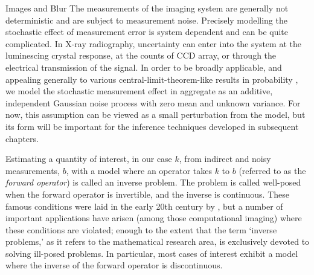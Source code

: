 \begin{chapter}{Images and Blur}
  The measurements of the imaging system are generally not deterministic and are subject to measurement noise.
  Precisely modelling the stochastic effect of measurement error is system dependent and can be quite complicated.
  In X-ray radiography, uncertainty can enter into the system at the luminescing crystal response, at the counts of CCD array, or through the electrical transmission of the signal.
  In order to be broadly applicable, and appealing generally to various central-limit-theorem-like results in probability \citep{durrett2010probability}, we model the stochastic measurement effect in aggregate as an additive, independent Gaussian noise process with zero mean and unknown variance.  
  For now, this assumption can be viewed as a small perturbation from the model, but its form will be important for the inference techniques developed in subsequent chapters.

  Estimating a quantity of interest, in our case $k$, from indirect and noisy measurements, $b$, with a model where an operator takes $k$ to $b$ (referred to as the \emph{forward operator}) is called an inverse problem.  
  The problem is called well-posed when the forward operator is invertible, and the inverse is continuous. %
  These famous conditions were laid in the early 20th century by \citep{hadamard1902}, but a number of important applications have arisen (among those computational imaging) where these conditions are violated; enough to the extent that the term `inverse problems,' as it refers to the mathematical research area, is exclusively devoted to solving ill-posed problems.
  In particular, most cases of interest %
  exhibit a model where the inverse of the forward operator is discontinuous.


\end{chapter}
